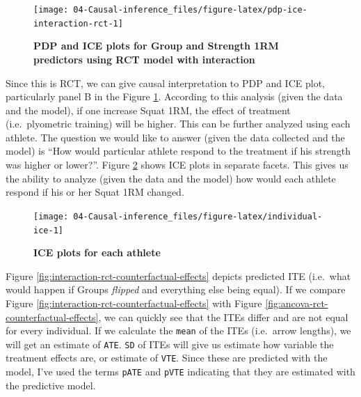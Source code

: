 \documentclass[
]{book}
\begin{document}
\begin{figure}

{\centering \texttt{[image: 04-Causal-inference\_files/figure-latex/pdp-ice-interaction-rct-1]} 

}

\caption{\textbf{PDP and ICE plots for Group and Strength 1RM predictors using RCT model with interaction}}\label{fig:pdp-ice-interaction-rct}
\end{figure}



Since this is RCT, we can give causal interpretation to PDP and ICE plot, particularly panel B in the Figure \ref{fig:pdp-ice-interaction-rct}. According to this analysis (given the data and the model), if one increase Squat 1RM, the effect of treatment (i.e.~plyometric training) will be higher. This can be further analyzed using each athlete. The question we would like to answer (given the data collected and the model) is ``How would particular athlete respond to the treatment if his strength was higher or lower?''. Figure \ref{fig:individual-ice} shows ICE plots in separate facets. This gives us the ability to analyze (given the data and the model) how would each athlete respond if his or her Squat 1RM changed.

\begin{figure}

{\centering \texttt{[image: 04-Causal-inference\_files/figure-latex/individual-ice-1]} 

}

\caption{\textbf{ICE plots for each athlete}}\label{fig:individual-ice}
\end{figure}



Figure \ref{fig:interaction-rct-counterfactual-effects} depicts predicted ITE (i.e.~what would happen if Groups \emph{flipped} and everything else being equal). If we compare Figure \ref{fig:interaction-rct-counterfactual-effects} with Figure \ref{fig:ancova-rct-counterfactual-effects}, we can quickly see that the ITEs differ and are not equal for every individual. If we calculate the \texttt{mean} of the ITEs (i.e.~arrow lengths), we will get an estimate of \texttt{ATE}. \texttt{SD} of ITEs will give us estimate how variable the treatment effects are, or estimate of \texttt{VTE}. Since these are predicted with the model, I've used the terms \texttt{pATE} and \texttt{pVTE} indicating that they are estimated with the predictive model.
\end{document}
